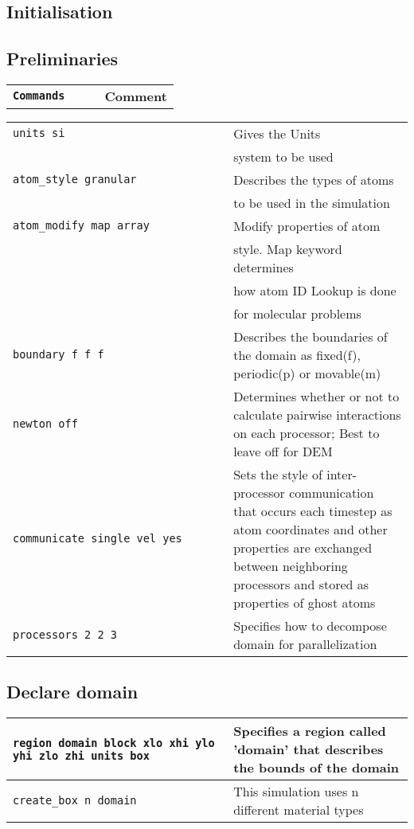 \documentclass[8pt]{extarticle} %
\begin{document}
\begin{multicols}{3}
\section[Initialisation]{Initialisation}


  \subsection{Preliminaries}
  \begin{tabular}{L{0.55\linewidth} L{0.45\linewidth}}
  \tt \textbf{Commands}         &     \textbf{Comment} \\
  \end{tabular}
  \begin{tabular}{L{0.55\linewidth} L{0.45\linewidth}}
    \tt units si     & Gives the Units \\ & system to be used \\
    \hline
    \tt atom\_style granular        & Describes the types of atoms \\ & to be used in the simulation \\
    \hline
    \tt atom\_modify map array        &  Modify properties of atom \\ & style.  Map keyword determines \\ & how atom ID Lookup is done \\ & for molecular problems  \\
    \hline
    \tt boundary f f f      & Describes the boundaries of the domain as fixed(f), periodic(p) or movable(m)                        \\
    \hline
    \tt newton off                  & Determines whether or not to calculate pairwise interactions on each processor; Best to leave off for DEM          \\
    \hline
    \tt communicate single vel yes                      & Sets the style of inter-processor communication that occurs each timestep as atom coordinates and other properties are exchanged between neighboring processors and stored as properties of ghost atoms         \\
    \hline
  \tt processors 2 2 3                & Specifies how to decompose domain for parallelization \\\hline
  \end{tabular}

  \vspace*{1ex}
  \vspace*{1ex}
  \subsection{Declare domain}
  \begin{tabular}{L{0.55\linewidth} L{0.45\linewidth}}
    \tt region domain block xlo xhi ylo yhi zlo zhi units box                     & Specifies a region called 'domain' that describes the bounds of the domain \\
    \hline
  \tt create\_box n domain         & This simulation uses n different material types\\
  \end{tabular}


\end{multicols}
\end{document}
